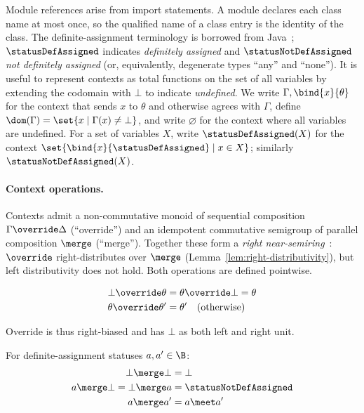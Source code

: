 \noindent Module references arise from import statements. A module declares each class name at most once, so the qualified name of a class entry is the identity of the class. The definite-assignment terminology is borrowed from Java~\cite[\S16]{gosling2025}; $\statusDefAssigned$ indicates \emph{definitely assigned} and $\statusNotDefAssigned$ \emph{not definitely assigned} (or, equivalently, degenerate types ``any'' and ``none'').
It is useful to represent contexts as total functions on the set of all variables by extending the codomain with $\bot$ to indicate \emph{undefined}. We write $\Gamma, \bind{x}{\theta}$ for the context that sends $x$ to $\theta$ and otherwise agrees with $\Gamma$, define $\dom(\Gamma) = \set{x \mid \Gamma(x) \neq \bot}$, and write $\varnothing$ for the context where all variables are undefined. For a set of variables $X$, write $\statusDefAssigned(X)$ for the context $\set{\bind{x}{\statusDefAssigned} \mid x \in X}$; similarly $\statusNotDefAssigned(X)$.

\paragraph{Context operations.}

Contexts admit a non-commutative monoid of sequential composition $\Gamma \override \Delta$ (``override'') and
an idempotent commutative semigroup of parallel composition $\merge$ (``merge''). Together these form a
\emph{right near-semiring}~\cite{vanhoorn1967}: $\override$ right-distributes over $\merge$ (Lemma~\ref{lem:right-distributivity}), but left
distributivity does not hold. Both operations are defined pointwise.
%
\begin{definition}
{\small
\begin{align*}
\bot \override \theta &= \theta \override \bot = \theta \\
\theta \override \theta' &= \theta' \quad (\text{otherwise})
\end{align*}}
\end{definition}

\noindent Override is thus right-biased and has $\bot$ as both left and right unit.

\begin{definition}
For definite-assignment statuses $a, a' \in \B$:
{\small
\begin{align*}
\bot \merge \bot &= \bot \\
a \merge \bot = \bot \merge a &= \statusNotDefAssigned \\
a \merge a' &= a \meet a'
\end{align*}}
\end{definition}

